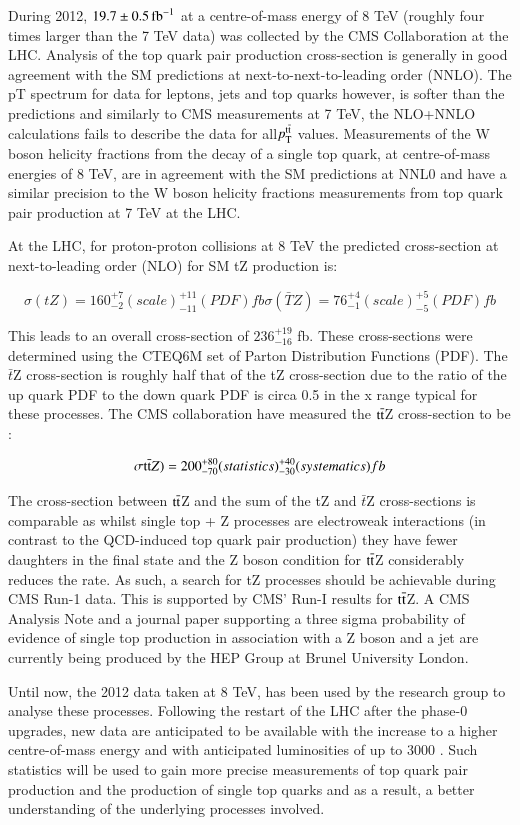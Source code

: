 During 2012, $19.7\pm0.5 \mbox{\ensuremath{\,\text{fb}^\text{$-$1}}}$ at a centre-of-mass energy of 8 TeV (roughly four times larger than the 7 TeV data) was collected by the CMS Collaboration at the LHC. 
Analysis of the top quark pair production cross-section is generally in good agreement with the SM predictions at next-to-next-to-leading order (NNLO). 
The pT spectrum for data for leptons, jets and top quarks however, is softer than the predictions and similarly to CMS measurements at 7 TeV, the NLO+NNLO calculations fails to describe the data for all$ p_{\mathrm{T}}^{\mathrm{t}\overline{\mathrm{t}}}$ values. 
Measurements of the W boson helicity fractions from the decay of a single top quark, at centre-of-mass energies of 8 TeV, are in agreement with the SM predictions at NNL0  and have a similar precision to the W boson helicity fractions measurements from top quark pair production at 7 TeV at the LHC.

At the LHC, for proton-proton collisions at 8 TeV the predicted cross-section at next-to-leading order (NLO) for SM tZ production is:

\begin{equation}
\sigma(tZ)= 160_{-2}^{+7} (scale)_{-11}^{+11} (PDF)  fb
\sigma(\bar{T}Z)= 76_{-1}^{+4} (scale)_{-5}^{+5} (PDF) fb
\end{equation}

This leads to an overall cross-section of $236_{-16}^{+19}$ fb. 
These cross-sections were determined using the CTEQ6M set of Parton Distribution Functions (PDF). 
The $\bar{t}$Z cross-section is roughly half that of the tZ cross-section due to the ratio of the up quark PDF to the down quark PDF is circa 0.5 in the x range typical for these processes. 
The CMS collaboration have measured the $\mathrm{t}\overline{\mathrm{t}}$Z cross-section to be :

\begin{equation}
\sigma \mathrm{t}\overline{\mathrm{t}} Z)= 200_{-70}^{+80} (statistics)_{-30}^{+40} (systematics) fb
\end{equation}

The cross-section between $\mathrm{t}\overline{\mathrm{t}}$Z and the sum of the tZ and $\bar{t}$Z cross-sections is comparable as whilst single top + Z processes are electroweak interactions (in contrast to the QCD-induced top quark pair production) they have fewer daughters in the final state and the Z boson condition for $\mathrm{t}\overline{\mathrm{t}}$Z considerably reduces the rate.
As such, a search for tZ processes should be achievable during CMS Run-1 data. This is supported by CMS’ Run-I results for $\mathrm{t}\overline{\mathrm{t}}$Z. 
A CMS Analysis Note and a journal paper supporting a three sigma probability of evidence of single top production in association with a Z boson and a jet are currently being produced by the HEP Group at Brunel University London.

Until now, the 2012 data taken at 8 TeV, has been used by the research group to analyse these processes.
Following the restart of the LHC after the phase-0 upgrades, new data are anticipated to be available with the increase to a higher centre-of-mass energy and with anticipated luminosities of up to 3000 \fbinv. 
Such statistics will be used to gain more precise measurements of top quark pair production and the production of single top quarks and as a result, a better understanding of the underlying processes involved.
